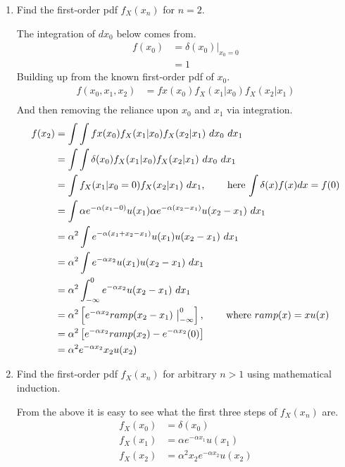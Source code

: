 \documentclass[12pt]{article}
\begin{document}
\begin{enumerate}[label=(\alph*)]
  \item Find the first-order pdf $f_X(x_n)$ for $n=2$.

The integration of $dx_0$ below comes from.
\begin{align*}
 f(x_0) &= \delta(x_0)\big|_{x_0=0} \\
  &= 1
\end{align*}
Building up from the known first-order pdf of $x_0$.
\begin{align*}
 f(x_0,x_1,x_2) &= fx(x_0)f_X(x_1|x_0)f_X(x_2|x_1) \\
\end{align*}
And then removing the reliance upon $x_0$ and $x_1$ via integration.
\begin{align*}
 f(x_2)         &= \int \int fx(x_0)f_X(x_1|x_0)f_X(x_2|x_1)\ dx_0\ dx_1 \\
                &= \int \int \delta(x_0) f_X(x_1|x_0)f_X(x_2|x_1)\ dx_0\ dx_1 \\
                &= \int f_X(x_1|x_0 = 0)f_X(x_2|x_1)\ dx_1 \text{, \qquad    here $\int \delta(x)f(x) dx = f(0)$}\\
                &= \int \alpha e^{-\alpha(x_1-0)}u(x_1)\alpha e^{-\alpha(x_2-x_1)}u(x_2-x_1)\ dx_1 \\
                &= \alpha^2\int e^{-\alpha(x_1+x_2-x_1)}u(x_1)u(x_2-x_1)\ dx_1 \\
                &= \alpha^2\int e^{-\alpha x_2}u(x_1)u(x_2-x_1)\ dx_1 \\
                &= \alpha^2\int^0_{-\infty} e^{-\alpha x_2}u(x_2-x_1)\ dx_1 \\
                &= \alpha^2\left[e^{-\alpha x_2}ramp(x_2-x_1)\ \big|^0_{-\infty}\right] \text{, \qquad where $ramp(x) = xu(x)$} \\
                &= \alpha^2\left[e^{-\alpha x_2}ramp(x_2)-e^{-\alpha x_2}(0)\right] \\
                &= \alpha^2e^{-\alpha x_2}x_2u(x_2) \\
\end{align*}

  \item Find the first-order pdf $f_X(x_n)$ for arbitrary $n>1$ using mathematical induction.

From the above it is easy to see what the first three steps of $f_X(x_n)$ are.
\begin{align*}
  f_X(x_0)&=\delta(x_0)\\
  f_X(x_1)&=\alpha e^{-\alpha x_1}u(x_1)\\
  f_X(x_2)&=\alpha ^2 x_2 e^{-\alpha x_2}u(x_2)\\
\end{align*}


\end{enumerate}
\end{document}
